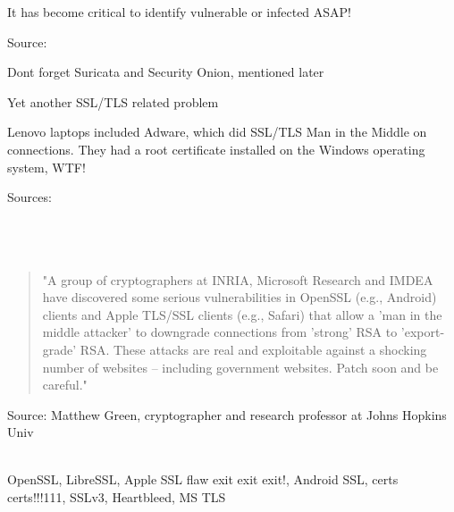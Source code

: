\documentclass[20pt,landscape,a4paper,footrule]{foils}
\begin{document}
\vskip 1cm

\centerline{It has become critical to identify vulnerable or infected ASAP!}

Source:
{\tiny{}}

Dont forget Suricata and Security Onion, mentioned later


\centerline{Yet another SSL/TLS related problem}


Lenovo laptops included Adware, which did SSL/TLS Man in the Middle on connections.
They had a root certificate installed on the Windows operating system, WTF!

{\footnotesize Sources:\\
\\
\\
\\
}{\tiny{}
}




\begin{quote}\small
"A group of cryptographers at INRIA, Microsoft Research and IMDEA have discovered some serious vulnerabilities in OpenSSL (e.g., Android) clients and Apple TLS/SSL clients (e.g., Safari) that allow a 'man in the middle attacker' to downgrade connections from 'strong' RSA to 'export-grade' RSA. These attacks are real and exploitable against a shocking number of websites -- including government websites. Patch soon and be careful."
\end{quote}

Source: Matthew Green, cryptographer and research professor at Johns Hopkins Univ\\
{\footnotesize{}\\
 
}


OpenSSL, LibreSSL, Apple SSL flaw exit exit exit!, Android SSL, certs certs!!!111, SSLv3, Heartbleed, MS TLS
\end{document}
